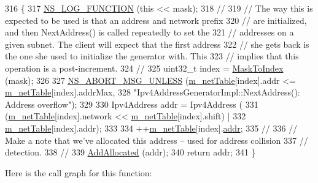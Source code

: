 \begin{DoxyCode}
316 \{
317   \hyperlink{log-macros-disabled_8h_a90b90d5bad1f39cb1b64923ea94c0761}{NS\_LOG\_FUNCTION} (\textcolor{keyword}{this} << mask);
318 \textcolor{comment}{//}
319 \textcolor{comment}{// The way this is expected to be used is that an address and network prefix}
320 \textcolor{comment}{// are initialized, and then NextAddress() is called repeatedly to set the}
321 \textcolor{comment}{// addresses on a given subnet.  The client will expect that the first address}
322 \textcolor{comment}{// she gets back is the one she used to initialize the generator with.  This}
323 \textcolor{comment}{// implies that this operation is a post-increment.}
324 \textcolor{comment}{//}
325   uint32\_t index = \hyperlink{classns3_1_1Ipv4AddressGeneratorImpl_a5049d4c03ccdeb1fcce7ab50baf23a86}{MaskToIndex} (mask);
326 
327   \hyperlink{group__fatal_ga0bd3f62c55e7347ff814572f3aaa3864}{NS\_ABORT\_MSG\_UNLESS} (\hyperlink{classns3_1_1Ipv4AddressGeneratorImpl_a9cdf3f8008d6e9d7ce32272db4d6dcc9}{m\_netTable}[index].addr <= 
      \hyperlink{classns3_1_1Ipv4AddressGeneratorImpl_a9cdf3f8008d6e9d7ce32272db4d6dcc9}{m\_netTable}[index].addrMax,
328                        \textcolor{stringliteral}{"Ipv4AddressGeneratorImpl::NextAddress(): Address overflow"});
329 
330   Ipv4Address addr = Ipv4Address (
331       (\hyperlink{classns3_1_1Ipv4AddressGeneratorImpl_a9cdf3f8008d6e9d7ce32272db4d6dcc9}{m\_netTable}[index].network << \hyperlink{classns3_1_1Ipv4AddressGeneratorImpl_a9cdf3f8008d6e9d7ce32272db4d6dcc9}{m\_netTable}[index].shift) |
332       \hyperlink{classns3_1_1Ipv4AddressGeneratorImpl_a9cdf3f8008d6e9d7ce32272db4d6dcc9}{m\_netTable}[index].addr);
333 
334   ++\hyperlink{classns3_1_1Ipv4AddressGeneratorImpl_a9cdf3f8008d6e9d7ce32272db4d6dcc9}{m\_netTable}[index].\hyperlink{classns3_1_1Ipv4AddressGeneratorImpl_1_1NetworkState_a9ef9d11050694760071d58b72659a7a3}{addr};
335 \textcolor{comment}{//}
336 \textcolor{comment}{// Make a note that we've allocated this address -- used for address collision}
337 \textcolor{comment}{// detection.}
338 \textcolor{comment}{//}
339   \hyperlink{classns3_1_1Ipv4AddressGeneratorImpl_a62767f63770e87118f36e702de8bd26c}{AddAllocated} (addr);
340   \textcolor{keywordflow}{return} addr;
341 \}
\end{DoxyCode}


Here is the call graph for this function\+:


